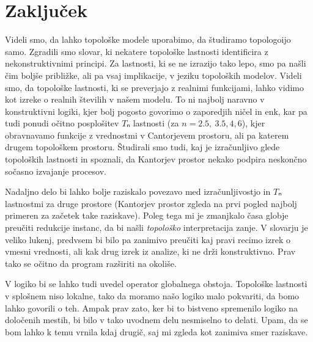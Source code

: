 \section{Zaključek}

Videli smo, da lahko topološke modele uporabimo, da študiramo topologoijo samo.
Zgradili smo slovar, ki nekatere topološke lastnosti identificira z
nekonstruktivnimi principi. Za lastnosti, ki se ne izrazijo tako lepo, smo pa
našli čim boljše približke, ali pa vsaj implikacije, v jeziku topoloških
modelov. Videli smo, da topološke lastnosti, ki se preverjajo z realnimi
funkcijami, lahko vidimo kot izreke o realnih številih v našem modelu. To ni
najbolj naravno v konstruktivni logiki, kjer bolj pogosto govorimo o zaporedjih
ničel in enk, kar pa tudi ponudi očitno posplošitev \(Tₙ\) lastnosti
(za \(n = 2.5,~3.5,4,6\)), kjer obravnavamo funkcije z vrednostmi v Cantorjevem
prostoru, ali pa katerem drugem topološkem prostoru. Študirali smo tudi, kaj je
izračunljivo glede topoloških lastnosti in spoznali, da Kantorjev prostor nekako
podpira neskončno sočasno izvajanje procesov.

Nadaljno delo bi lahko bolje raziskalo povezavo med izračunljivostjo in \(Tₙ\)
lastnostmi za druge prostore (Kantorjev prostor zgleda na prvi pogled najbolj
primeren za začetek take raziskave). Poleg tega mi je zmanjkalo časa globje
preučiti redukcije instanc, da bi našli \emph{topološko} interpretacija zanje.
V slovarju je veliko lukenj, predvsem bi bilo pa zanimivo preučiti kaj pravi
recimo izrek o vmesni vrednosti, ali kak drug izrek iz analize, ki ne drži
konstruktivno. Prav tako se očitno da program razširiti na okoliše.

V logiko bi se lahko tudi uvedel operator globalnega obstoja. Topološke
lastnosti v splošnem niso lokalne, tako da moramo našo logiko malo pokvariti, da
bomo lahko govorili o teh. Ampak prav zato, ker bi to bistveno spremenilo logiko
na določenih mestih, bi bilo v tako uvodnem delu nesmiselno to delati. Upam, da
se bom lahko k temu vrnila kdaj drugič, saj mi zgleda kot zanimiva smer raziskave.



